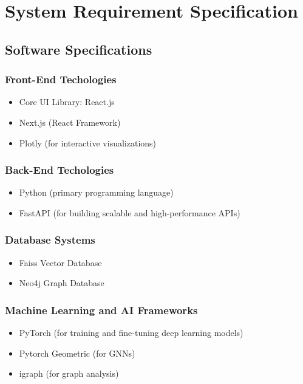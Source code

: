 \documentclass[a4paper,12pt]{article}
\begin{document}
\section{System Requirement Specification}
\subsection{Software Specifications}
\subsubsection{Front-End Techologies}
\begin{itemize}
    \item Core UI Library: React.js
    \vspace{-10pt}
    \item Next.js (React Framework)
    \vspace{-10pt}
    \item Plotly (for interactive visualizations)
\end{itemize}

\subsubsection{Back-End Techologies}
\begin{itemize}
    \item Python (primary programming language)
    \vspace{-10pt}
    \item FastAPI (for building scalable and high-performance APIs)
\end{itemize}

\subsubsection{Database Systems}
\begin{itemize}
    \item Faiss Vector Database
    \vspace{-10pt}
    \item Neo4j Graph Database
\end{itemize}

\subsubsection{Machine Learning and AI Frameworks}
\begin{itemize}
    \item PyTorch (for training and fine-tuning deep learning models)
    \vspace{-10pt}
    \item Pytorch Geometric (for GNNs)
    \vspace{-10pt}
    \item igraph (for graph analysis)
\end{itemize}
\end{document}

